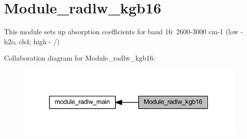 \hypertarget{group__module__radlw__kgb16}{}\section{Module\+\_\+radlw\+\_\+kgb16}
\label{group__module__radlw__kgb16}


This module sets up absorption coefficients for band 16\+: 2600-\/3000 cm-\/1 (low -\/ h2o, ch4; high -\/ /)  


Collaboration diagram for Module\+\_\+radlw\+\_\+kgb16\+:\nopagebreak
\begin{figure}[H]
\begin{center}
\leavevmode
\includegraphics[width=325pt]{group__module__radlw__kgb16}
\end{center}
\end{figure}
